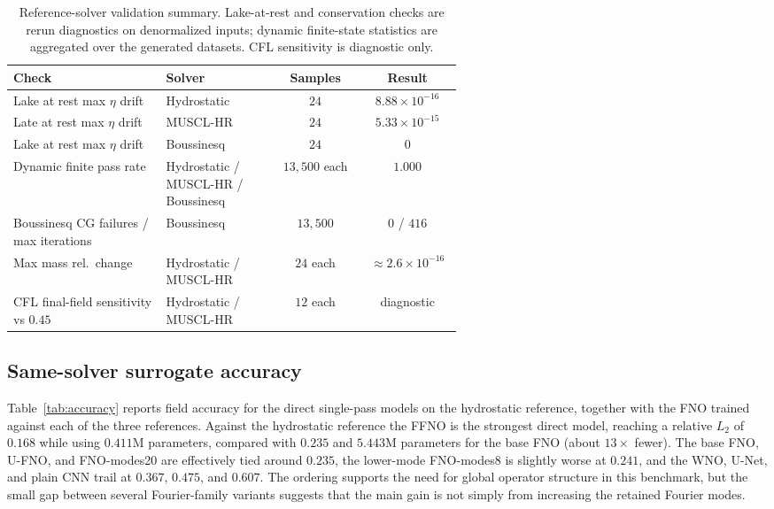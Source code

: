 \begin{table}[!htbp]
\centering
\caption{Reference-solver validation summary. Lake-at-rest and conservation checks are rerun diagnostics on denormalized inputs; dynamic finite-state statistics are aggregated over the generated datasets. CFL sensitivity is diagnostic only.}
\label{tab:solver-validation}
\begin{tabular}{p{0.34\linewidth}p{0.25\linewidth}cc}
    \toprule
    Check & Solver & Samples & Result \\
    \midrule
    Lake at rest max $\eta$ drift           & Hydrostatic & $24$ & $8.88 \times 10 ^ {-16}$ \\
    Late at rest max $\eta$ drift           & MUSCL-HR    & $24$ & $5.33 \times 10 ^ {-15}$ \\
    Lake at rest max $\eta$ drift           & Boussinesq  & $24$ & $0$ \\
    Dynamic finite pass rate                & Hydrostatic / MUSCL-HR / Boussinesq & $13{,}500$ each & $1.000$ \\
    Boussinesq CG failures / max iterations & Boussinesq  & $13{,}500$ & $0$ / $416$ \\
    Max mass rel.\ change                   & Hydrostatic / MUSCL-HR & $24$ each & $\approx 2.6 \times 10 ^ {-16}$ \\
    CFL final-field sensitivity vs $0.45$   & Hydrostatic / MUSCL-HR & $12$ each & diagnostic \\
    \bottomrule
\end{tabular}
\end{table}

\subsection{Same-solver surrogate accuracy}
\label{subsec:res-accuracy}

Table~\ref{tab:accuracy} reports field accuracy for the direct single-pass models on the hydrostatic reference, together with the FNO trained against each of the three references. Against the hydrostatic reference the FFNO is the strongest direct model, reaching a relative $L_2$ of $0.168$ while using $0.411$M parameters, compared with $0.235$ and $5.443$M parameters for the base FNO (about $13 \times$ fewer). The base FNO, U-FNO, and FNO-modes20 are effectively tied around $0.235$, the lower-mode FNO-modes8 is slightly worse at $0.241$, and the WNO, U-Net, and plain CNN trail at $0.367$, $0.475$, and $0.607$. The ordering supports the need for global operator structure in this benchmark, but the small gap between several Fourier-family variants suggests that the main gain is not simply from increasing the retained Fourier modes.

